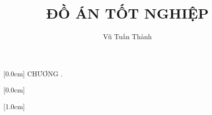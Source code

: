 \documentclass[a4paper, twoside]{report}
\title{\bf ĐỒ ÁN TỐT NGHIỆP} %
\author{Vũ Tuấn Thành} %
\theoremstyle{definition} %
\begin{document}
	
	\pagestyle{plain} %
	
	\newpage
	
	
	\newpage
	
	
	\newpage
	
	
	\newpage
	\renewcommand*\contentsname{MỤC LỤC}
	\contentsmargin{2.5em}
	
	
	[0.0cm]
	{\bfseries\vspace{0.15cm}}
	{CHƯƠNG \thecontentslabel.\ }
	{}
	{\contentspage}
	
	
	[0.0cm]
	{}
	{\thecontentslabel\quad}
	{}
	{\contentspage}
	
	[1.0cm]             %
	{}
	{\thecontentslabel\quad} %
	{}         %
	{\contentspage}         %
	
	\tableofcontents
	\thispagestyle{empty}
	\clearpage
	
	\newpage
	\renewcommand{\listfigurename}{DANH MỤC HÌNH VẼ}
	{\let\oldnumberline\numberline
		\renewcommand{\numberline}{Hình~\oldnumberline}
		\listoffigures} 
		
	
	\renewcommand{\listtablename}{DANH MỤC BẢNG BIỂU}
	{\let\oldnumberline\numberline
		\renewcommand{\numberline}{Bảng~\oldnumberline}
		\listoftables}
	
	
	
	\newpage
	
	
\end{document}
